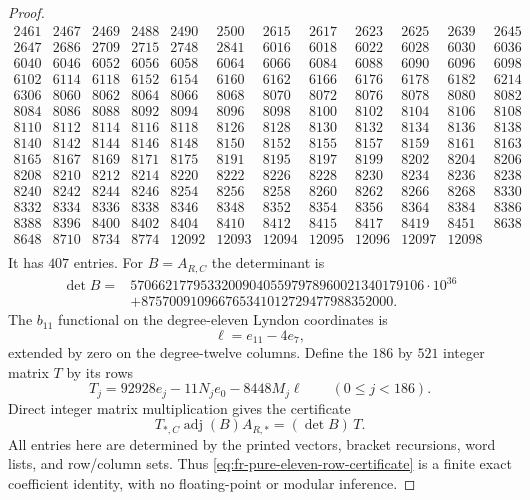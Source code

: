 \begin{proof}
{\[\begin{array}{rrrrrrrrrrrr}
2461 & 2467 & 2469 & 2488 & 2490 & 2500 & 2615 & 2617 & 2623 & 2625 & 2639 & 2645 \\
2647 & 2686 & 2709 & 2715 & 2748 & 2841 & 6016 & 6018 & 6022 & 6028 & 6030 & 6036 \\
6040 & 6046 & 6052 & 6056 & 6058 & 6064 & 6066 & 6084 & 6088 & 6090 & 6096 & 6098 \\
6102 & 6114 & 6118 & 6152 & 6154 & 6160 & 6162 & 6166 & 6176 & 6178 & 6182 & 6214 \\
6306 & 8060 & 8062 & 8064 & 8066 & 8068 & 8070 & 8072 & 8076 & 8078 & 8080 & 8082 \\
8084 & 8086 & 8088 & 8092 & 8094 & 8096 & 8098 & 8100 & 8102 & 8104 & 8106 & 8108 \\
8110 & 8112 & 8114 & 8116 & 8118 & 8126 & 8128 & 8130 & 8132 & 8134 & 8136 & 8138 \\
8140 & 8142 & 8144 & 8146 & 8148 & 8150 & 8152 & 8155 & 8157 & 8159 & 8161 & 8163 \\
8165 & 8167 & 8169 & 8171 & 8175 & 8191 & 8195 & 8197 & 8199 & 8202 & 8204 & 8206 \\
8208 & 8210 & 8212 & 8214 & 8220 & 8222 & 8226 & 8228 & 8230 & 8234 & 8236 & 8238 \\
8240 & 8242 & 8244 & 8246 & 8254 & 8256 & 8258 & 8260 & 8262 & 8266 & 8268 & 8330 \\
8332 & 8334 & 8336 & 8338 & 8346 & 8348 & 8352 & 8354 & 8356 & 8364 & 8384 & 8386 \\
8388 & 8396 & 8400 & 8402 & 8404 & 8410 & 8412 & 8415 & 8417 & 8419 & 8451 & 8638 \\
8648 & 8710 & 8734 & 8774 & 12092 & 12093 & 12094 & 12095 & 12096 & 12097 & 12098 &  \\
\end{array}
\]}
It has $407$ entries. For $B=A_{R,C}$ the determinant is
\[
 \begin{aligned}
 \det B={}&570662177953320090405597978960021340179106\cdot10^{36}\\
 &+875700910966765341012729477988352000.
 \end{aligned}
\]
The $b_{11}$ functional on the degree-eleven Lyndon coordinates
is
\[
 \ell=e_{11}-4e_7,
\]
extended by zero on the degree-twelve columns. Define the
$186$ by $521$ integer matrix $T$ by its rows
\[
 T_j=92928e_j-11N_j e_0-8448M_j\ell
       \qquad(0\le j<186).
\]
Direct integer matrix multiplication gives the certificate
\begin{equation}\label{eq:fr-pure-eleven-row-certificate}
 T_{*,C}\operatorname{adj}(B)A_{R,*}=(\det B)\,T.
\end{equation}
All entries here are determined by the printed vectors,
bracket recursions, word lists, and row/column sets. Thus
\eqref{eq:fr-pure-eleven-row-certificate} is a finite exact
coefficient identity, with no floating-point or modular
inference.


\end{proof}
